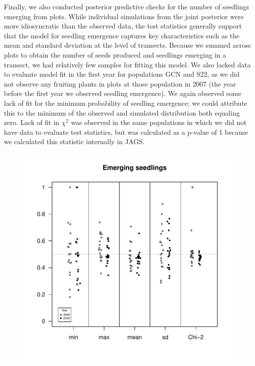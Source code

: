 \documentclass[12pt, oneside, titlepage]{article}   	%
\begin{document}
Finally, we also conducted posterior predictive checks for the number of seedlings emerging from plots. While individual simulations from the joint posterior were more idiosyncratic than the observed data, the test statistics generally support that the model for seedling emergence captures key characteristics such as the mean and standard deviation at the level of transects. Because we summed across plots to obtain the number of seeds produced and seedlings emerging in a transect, we had relatively few samples for fitting this model. We also lacked data to evaluate model fit in the first year for populations GCN and S22, as we did not observe any fruiting plants in plots at those population in 2007 (the year before the first year we observed seedling emergence). We again observed some lack of fit for the minimum probability of seedling emergence; we could attribute this to the minimum of the observed and simulated distribution both equaling zero. Lack of fit in $\chi^2$ was observed in the same populations in which we did not have data to evaluate test statistics, but was calculated as a p-value of 1 because we calculated this statistic internally in JAGS.

\begin{figure}[!h]
   \centering
       \includegraphics[page=1,scale=.75]{../../figures/modelChecks/s0-ppc.pdf}  
 \label{fig:name}
\end{figure}
\end{document}
